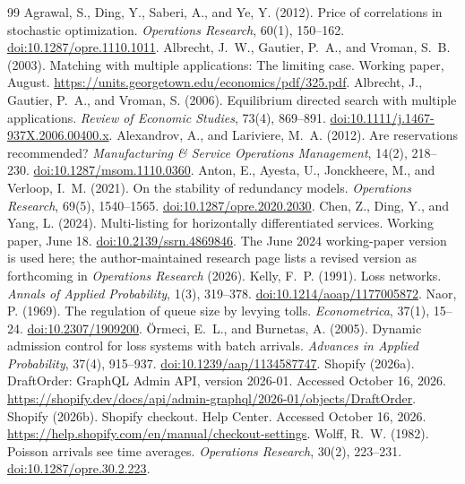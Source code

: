 \documentclass[11pt,a4paper]{article}
\begin{document}
{\small\raggedright\setlength{\bibsep}{3pt}
\begin{thebibliography}{99}
 Agrawal, S., Ding, Y., Saberi, A., and Ye, Y. (2012). Price of correlations in stochastic optimization. \emph{Operations Research}, 60(1), 150--162. \href{https://doi.org/10.1287/opre.1110.1011}{doi:10.1287/opre.1110.1011}.
 Albrecht, J.~W., Gautier, P.~A., and Vroman, S.~B. (2003). Matching with multiple applications: The limiting case. Working paper, August. \url{https://units.georgetown.edu/economics/pdf/325.pdf}.
 Albrecht, J., Gautier, P.~A., and Vroman, S. (2006). Equilibrium directed search with multiple applications. \emph{Review of Economic Studies}, 73(4), 869--891. \href{https://doi.org/10.1111/j.1467-937X.2006.00400.x}{doi:10.1111/j.1467-937X.2006.00400.x}.
 Alexandrov, A., and Lariviere, M.~A. (2012). Are reservations recommended? \emph{Manufacturing \& Service Operations Management}, 14(2), 218--230. \href{https://doi.org/10.1287/msom.1110.0360}{doi:10.1287/msom.1110.0360}.
 Anton, E., Ayesta, U., Jonckheere, M., and Verloop, I.~M. (2021). On the stability of redundancy models. \emph{Operations Research}, 69(5), 1540--1565. \href{https://doi.org/10.1287/opre.2020.2030}{doi:10.1287/opre.2020.2030}.
 Chen, Z., Ding, Y., and Yang, L. (2024). Multi-listing for horizontally differentiated services. Working paper, June 18. \href{https://doi.org/10.2139/ssrn.4869846}{doi:10.2139/ssrn.4869846}. The June 2024 working-paper version is used here; the author-maintained research page lists a revised version as forthcoming in \emph{Operations Research} (2026).
 Kelly, F.~P. (1991). Loss networks. \emph{Annals of Applied Probability}, 1(3), 319--378. \href{https://doi.org/10.1214/aoap/1177005872}{doi:10.1214/aoap/1177005872}.
 Naor, P. (1969). The regulation of queue size by levying tolls. \emph{Econometrica}, 37(1), 15--24. \href{https://doi.org/10.2307/1909200}{doi:10.2307/1909200}.
 \"Ormeci, E.~L., and Burnetas, A. (2005). Dynamic admission control for loss systems with batch arrivals. \emph{Advances in Applied Probability}, 37(4), 915--937. \href{https://doi.org/10.1239/aap/1134587747}{doi:10.1239/aap/1134587747}.
 Shopify (2026a). DraftOrder: GraphQL Admin API, version 2026-01. Accessed October 16, 2026. \url{https://shopify.dev/docs/api/admin-graphql/2026-01/objects/DraftOrder}.
 Shopify (2026b). Shopify checkout. Help Center. Accessed October 16, 2026. \url{https://help.shopify.com/en/manual/checkout-settings}.
 Wolff, R.~W. (1982). Poisson arrivals see time averages. \emph{Operations Research}, 30(2), 223--231. \href{https://doi.org/10.1287/opre.30.2.223}{doi:10.1287/opre.30.2.223}.
\end{thebibliography}
}
\end{document}
